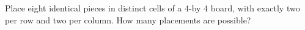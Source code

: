 Place eight identical pieces in distinct cells of a 4-by 4 board, with exactly two per row and two per column. How many placements are possible?
